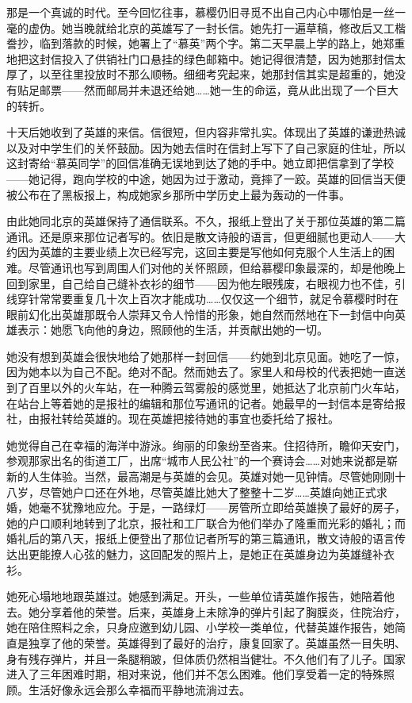 \par 那是一个真诚的时代。至今回忆往事，慕樱仍旧寻觅不出自己内心中哪怕是一丝一毫的虚伪。她当晚就给北京的英雄写了一封长信。她先打一遍草稿，修改后又工楷誊抄，临到落款的时候，她署上了“慕英”两个字。第二天早晨上学的路上，她郑重地把这封信投入了供销社门口悬挂的绿色邮箱中。她记得很清楚，因为她那封信太厚了，以至往里投放时不那么顺畅。细细考究起来，她那封信其实是超重的，她没有贴足邮票——然而邮局并未退还给她……她一生的命运，竟从此出现了一个巨大的转折。
\par 十天后她收到了英雄的来信。信很短，但内容非常扎实。体现出了英雄的谦逊热诚以及对中学生们的关怀鼓励。因为她去信时在信封上写下了自己家庭的住址，所以这封寄给“慕英同学”的回信准确无误地到达了她的手中。她立即把信拿到了学校——她记得，跑向学校的中途，她因为过于激动，竟摔了一跤。英雄的回信当天便被公布在了黑板报上，构成她家乡那所中学历史上最为轰动的一件事。
\par 由此她同北京的英雄保持了通信联系。不久，报纸上登出了关于那位英雄的第二篇通讯。还是原来那位记者写的。依旧是散文诗般的语言，但更细腻也更动人——大约因为英雄的主要业绩上次已经写完，这回主要是写他如何克服个人生活上的困难。尽管通讯也写到周围人们对他的关怀照顾，但给慕樱印象最深的，却是他晚上回到家里，自己给自己缝补衣衫的细节——因为他左眼残废，右眼视力也不佳，引线穿针常常要重复几十次上百次才能成功……仅仅这一个细节，就足令慕樱时时在眼前幻化出英雄那既令人崇拜又令人怜惜的形象，她自然而然地在下一封信中向英雄表示：她愿飞向他的身边，照顾他的生活，并贡献出她的一切。
\par 她没有想到英雄会很快地给了她那样一封回信——约她到北京见面。她吃了一惊，因为她本以为自己不配。绝对不配。然而她去了。家里人和母校的代表把她一直送到了百里以外的火车站，在一种腾云驾雾般的感觉里，她抵达了北京前门火车站，在站台上等着她的是报社的编辑和那位写通讯的记者。她最早的一封信本是寄给报社，由报社转给英雄的。现在英雄把接待她的事宜也委托给了报社。
\par 她觉得自己在幸福的海洋中游泳。绚丽的印象纷至沓来。住招待所，瞻仰天安门，参观那家出名的街道工厂，出席“城市人民公社”的一个赛诗会……对她来说都是崭新的人生体验。当然，最高潮是与英雄的会见。英雄对她一见钟情。尽管她刚刚十八岁，尽管她户口还在外地，尽管英雄比她大了整整十二岁……英雄向她正式求婚，她毫不犹豫地应允。于是，一路绿灯——房管所立即给英雄换了最好的房子，她的户口顺利地转到了北京，报社和工厂联合为他们举办了隆重而光彩的婚礼；而婚礼后的第八天，报纸上便登出了那位记者所写的第三篇通讯，散文诗般的语言传达出更能撩人心弦的魅力，这回配发的照片上，是她正在英雄身边为英雄缝补衣衫。
\par 她死心塌地地跟英雄过。她感到满足。开头，一些单位请英雄作报告，她陪着他去。她分享着他的荣誉。后来，英雄身上未除净的弹片引起了胸膜炎，住院治疗，她在陪住照料之余，只身应邀到幼儿园、小学校一类单位，代替英雄作报告，她简直是独享了他的荣誉。英雄得到了最好的治疗，康复回家了。英雄虽然一目失明、身有残存弹片，并且一条腿稍跛，但体质仍然相当健壮。不久他们有了儿子。国家进入了三年困难时期，相对来说，他们并不怎么困难。他们享受着一定的特殊照顾。生活好像永远会那么幸福而平静地流淌过去。
